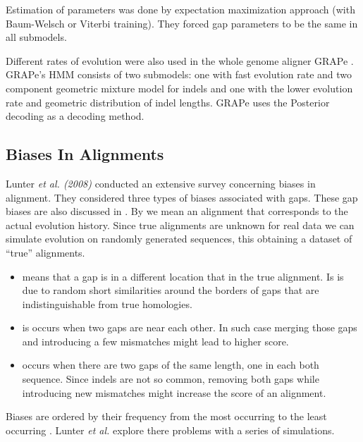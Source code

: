 Estimation of parameters was done by expectation maximization approach (with
Baum-Welsch or Viterbi training). They forced gap parameters to be the same in all
submodels.

Different rates of evolution were also used  in the whole genome aligner GRAPe
\cite{Satija2010}. GRAPe's HMM  consists of two submodels: one with fast
evolution rate and two component geometric mixture model for indels and one with
the lower evolution rate and geometric distribution of indel lengths. GRAPe uses
the Posterior decoding as a decoding method.

\subsection{Biases In Alignments}
\label{SECTION:BIASES}
Lunter {\it et al. (2008)} conducted an extensive survey concerning biases in
alignment. They considered three types of biases associated with gaps. These gap
biases are also discussed in \cite{Durbin1998}. By 
we mean an alignment that corresponds to the actual evolution history.  Since
true alignments are unknown for real data we can simulate evolution on randomly
generated sequences, this obtaining a dataset of ``true'' alignments.

\begin{itemize}[itemsep=-1mm]

\item {} means that a gap is in a different location that in
the true alignment. Is is due to random short similarities around the borders of
gaps that are indistinguishable from true homologies.

\item {} is occurs when two gaps are near each other.
In such case merging those gaps and introducing a few mismatches might lead to
higher score. 

\item {} occurs when there are two gaps of the same
length, one in each both sequence. Since indels are not so common, removing both
gaps while introducing new mismatches might increase the score of an alignment.

\end{itemize}


Biases are ordered by their frequency from the most occurring to the least
occurring \cite{Lunter2008}. Lunter {\it et al.} explore there problems with a
series of simulations.

